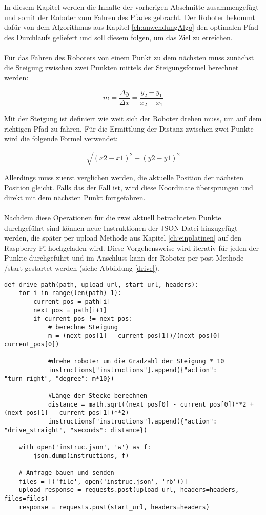 In diesem Kapitel werden die Inhalte der vorherigen Abschnitte zusammengefügt und somit der Roboter zum Fahren des Pfades gebracht. Der Roboter bekommt dafür von dem Algorithmus aus Kapitel \ref{ch:anwendungAlgo} den optimalen Pfad des Durchlaufs geliefert und soll diesem folgen, um das Ziel zu erreichen.\\\\
Für das Fahren des Roboters von einem Punkt zu dem nächsten muss zunächst die Steigung zwischen zwei Punkten mittels der Steigungsformel berechnet werden:

    \[m = \frac{\Delta y}{\Delta x} = \frac{y_2 - y_1}{x_2 - x_1}\]

Mit der Steigung ist definiert wie weit sich der Roboter drehen muss, um auf dem richtigen Pfad zu fahren. Für die Ermittlung der Distanz zwischen zwei Punkte wird die folgende Formel verwendet:

    \[\sqrt{(x2 - x1)^2 + (y2 -y1)^2}\]
    
Allerdings muss zuerst verglichen werden, die aktuelle Position der nächsten Position gleicht. Falls das der Fall ist, wird diese Koordinate übersprungen und direkt mit dem nächsten Punkt fortgefahren. \\\\
Nachdem diese Operationen für die zwei aktuell betrachteten Punkte durchgeführt sind können neue Instruktionen der JSON Datei hinzugefügt werden, die später per \glqq upload\grqq{} Methode aus Kapitel \ref{ch:einplatinen} auf den Raspberry Pi hochgeladen wird. Diese Vorgehensweise wird iterativ für jeden der Punkte durchgeführt und im Anschluss kann der Roboter per post Methode \glqq /start\grqq{} gestartet werden (siehe Abbildung \ref{drive}).
    \begin{verbatim}
def drive_path(path, upload_url, start_url, headers):
    for i in range(len(path)-1):
        current_pos = path[i]
        next_pos = path[i+1]
        if current_pos != next_pos:
            # berechne Steigung
            m = (next_pos[1] - current_pos[1])/(next_pos[0] - current_pos[0])   

            #drehe roboter um die Gradzahl der Steigung * 10
            instructions["instructions"].append({"action": "turn_right", "degree": m*10})
            
            #Länge der Stecke berechnen
            distance = math.sqrt((next_pos[0] - current_pos[0])**2 + (next_pos[1] - current_pos[1])**2)
            instructions["instructions"].append({"action": "drive_straight", "seconds": distance})

    with open('instruc.json', 'w') as f:
        json.dump(instructions, f)

    # Anfrage bauen und senden
    files = [('file', open('instruc.json', 'rb'))]
    upload_response = requests.post(upload_url, headers=headers, files=files)
    response = requests.post(start_url, headers=headers)
        \end{verbatim}
        \vspace*{-3mm}
        \vspace*{3mm}